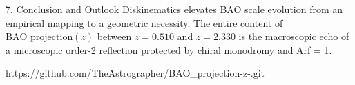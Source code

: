7. Conclusion and Outlook
Diskinematics elevates BAO scale evolution from an empirical mapping to a geometric necessity. The entire content of \(\mathrm{BAO\_projection}(z)\) between \(z=0.510\) and \(z=2.330\) is the macroscopic echo of a microscopic order-2 reflection protected by chiral monodromy and Arf = 1.

https://github.com/TheAstrographer/BAO_projection-z-.git
  
